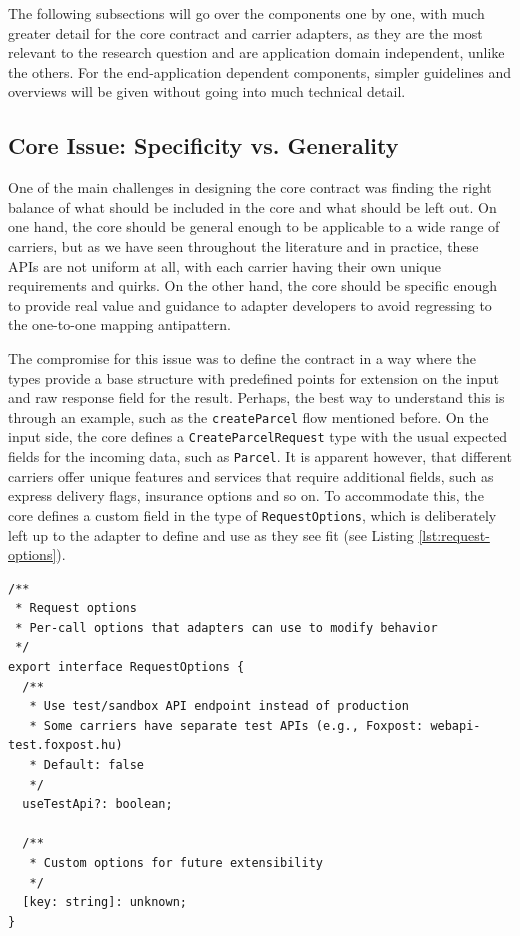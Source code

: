 \documentclass{imc-inf}
\begin{document}
The following subsections will go over the components one by one, with much greater detail for the core contract and carrier adapters, as they are the most relevant to the research question and are application domain independent, unlike the others.
For the end-application dependent components, simpler guidelines and overviews will be given without going into much technical detail.

\subsection{Core Issue: Specificity vs. Generality}
One of the main challenges in designing the core contract was finding the right balance of what should be included in the core and what should be left out.
On one hand, the core should be general enough to be applicable to a wide range of carriers, but as we have seen throughout the literature and in practice, these APIs are not uniform at all, with each carrier having their own unique requirements and quirks.
On the other hand, the core should be specific enough to provide real value and guidance to adapter developers to avoid regressing to the one-to-one mapping antipattern.

The compromise for this issue was to define the contract in a way where the types provide a base structure with predefined points for extension on the input and raw response field for the result.
Perhaps, the best way to understand this is through an example, such as the \texttt{createParcel} flow mentioned before.
On the input side, the core defines a \texttt{CreateParcelRequest} type with the usual expected fields for the incoming data, such as \texttt{Parcel}.
It is apparent however, that different carriers offer unique features and services that require additional fields, such as express delivery flags, insurance options and so on.
To accommodate this, the core defines a custom field in the type of \texttt{RequestOptions}, which is deliberately left up to the adapter to define and use as they see fit (see Listing \ref{lst:request-options}).

\begin{listing}[!htbp]
  \caption{Core request options extensibility in \texttt{src/core/request-options.ts}}
  \label{lst:request-options}
  \begin{verbatim}
/**
 * Request options
 * Per-call options that adapters can use to modify behavior
 */
export interface RequestOptions {
  /**
   * Use test/sandbox API endpoint instead of production
   * Some carriers have separate test APIs (e.g., Foxpost: webapi-test.foxpost.hu)
   * Default: false
   */
  useTestApi?: boolean;

  /**
   * Custom options for future extensibility
   */
  [key: string]: unknown;
}
\end{verbatim}
\end{listing}
\end{document}
